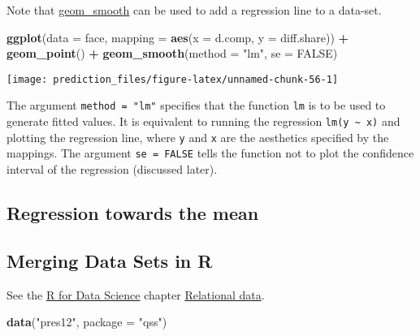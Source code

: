 \documentclass[]{book}
\newenvironment{Shaded}{\begin{snugshade}}{\end{snugshade}}
\newcommand{\DataTypeTok}[1]{\textcolor[rgb]{0.13,0.29,0.53}{#1}}
\newcommand{\KeywordTok}[1]{\textcolor[rgb]{0.13,0.29,0.53}{\textbf{#1}}}
\newcommand{\NormalTok}[1]{#1}
\newcommand{\OperatorTok}[1]{\textcolor[rgb]{0.81,0.36,0.00}{\textbf{#1}}}
\newcommand{\OtherTok}[1]{\textcolor[rgb]{0.56,0.35,0.01}{#1}}
\newcommand{\StringTok}[1]{\textcolor[rgb]{0.31,0.60,0.02}{#1}}
\theoremstyle{definition}
\theoremstyle{definition}
\theoremstyle{definition}
\theoremstyle{remark}
\begin{document}
Note that
\href{http://docs.ggplot2.org/current/geom_smooth.html}{geom\_smooth}
can be used to add a regression line to a data-set.

\begin{Shaded}
\begin{Highlighting}[]
\KeywordTok{ggplot}\NormalTok{(}\DataTypeTok{data =}\NormalTok{ face, }\DataTypeTok{mapping =} \KeywordTok{aes}\NormalTok{(}\DataTypeTok{x =}\NormalTok{ d.comp, }\DataTypeTok{y =}\NormalTok{ diff.share)) }\OperatorTok{+}
\StringTok{  }\KeywordTok{geom_point}\NormalTok{() }\OperatorTok{+}
\StringTok{  }\KeywordTok{geom_smooth}\NormalTok{(}\DataTypeTok{method =} \StringTok{"lm"}\NormalTok{, }\DataTypeTok{se =} \OtherTok{FALSE}\NormalTok{)}
\end{Highlighting}
\end{Shaded}

\begin{center}\texttt{[image: prediction\_files/figure-latex/unnamed-chunk-56-1]} \end{center}

The argument \texttt{method\ =\ "lm"} specifies that the function
\texttt{lm} is to be used to generate fitted values. It is equivalent to
running the regression \texttt{lm(y\ \textasciitilde{}\ x)} and plotting
the regression line, where \texttt{y} and \texttt{x} are the aesthetics
specified by the mappings. The argument \texttt{se\ =\ FALSE} tells the
function not to plot the confidence interval of the regression
(discussed later).

\hypertarget{regression-towards-the-mean}{%
\subsection{Regression towards the
mean}\label{regression-towards-the-mean}}

\hypertarget{merging-data-sets-in-r}{%
\subsection{Merging Data Sets in R}\label{merging-data-sets-in-r}}

See the \href{http://r4ds.had.co.nz/}{R for Data Science} chapter
\href{http://r4ds.had.co.nz/relational-data.html}{Relational data}.

\begin{Shaded}
\begin{Highlighting}[]
\KeywordTok{data}\NormalTok{(}\StringTok{"pres12"}\NormalTok{, }\DataTypeTok{package =} \StringTok{"qss"}\NormalTok{)}
\end{Highlighting}
\end{Shaded}
\end{document}
